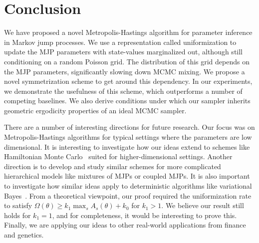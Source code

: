 \section{Conclusion}

We have proposed a novel Metropolis-Hastings algorithm for parameter 
inference in Markov jump processes. We use a representation called 
uniformization to update the MJP parameters with state-values marginalized 
out, although still conditioning on a random Poisson grid. The 
distribution of this grid depends on the MJP parameters, significantly 
slowing down MCMC mixing. We propose a novel symmetrization scheme to get 
around this dependency. In our experiments, we demonstrate the usefulness 
of this scheme, which outperforms a number of competing baselines.
We also derive conditions under which our sampler inherits geometric 
ergodicity properties of an ideal MCMC sampler.

There are a number of interesting directions for future research.
Our focus was on Metropolis-Hastings algorithms for typical settings 
where the parameters are low dimensional. It is interesting to 
investigate how our ideas extend to schemes like Hamiltonian Monte 
Carlo~\cite{Neal2010} suited for higher-dimensional settings. Another 
direction is to develop and study similar schemes for more complicated 
hierarchical models like mixtures of MJPs or coupled MJPs. It is also 
important to investigate how similar ideas apply to deterministic 
algorithms like variational Bayes~\cite{panzanrao17}. From a theoretical 
viewpoint, our proof required the uniformization rate to satisfy 
$\Omega(\theta) \ge k_1 \max_s A_s(\theta) + k_0$ for $k_1 > 1$. We 
believe our result still holds for $k_1 = 1$, and for completeness, 
it would be interesting to prove this.  Finally, we are applying 
our ideas to other real-world applications from finance and genetics.
